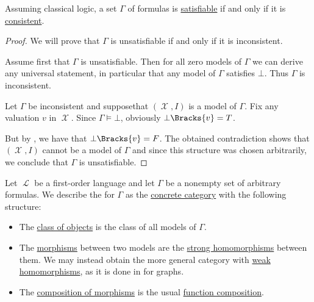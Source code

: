 \begin{proposition}\label{thm:formulas_satisfiable_iff_consistent}
  Assuming classical logic, a set \( \Gamma \) of formulas is \hyperref[def:propositional_semantics/satisfiability]{satisfiable} if and only if it is \hyperref[def:first_order_theory/consistent]{consistent}.
\end{proposition}
\begin{proof}
  We will prove that \( \Gamma \) is unsatisfiable if and only if it is inconsistent\DNE.

  \SufficiencySubProof Assume first that \( \Gamma \) is unsatisfiable. Then for all zero models of \( \Gamma \) we can derive any universal statement, in particular that any model of \( \Gamma \) satisfies \( \bot \). Thus \( \Gamma \) is inconsistent.

  \NecessitySubProof Let \( \Gamma \) be inconsistent and suppose\DNE that \( (\mscrX, I) \) is a model of \( \Gamma \). Fix any valuation \( v \) in \( \mscrX \). Since \( \Gamma \vDash \bot \), obviously \( \bot\Bracks{v} = T \).

  But by , we have that \( \bot\Bracks{v} = F \). The obtained contradiction shows that \( (\mscrX, I) \) cannot be a model of \( \Gamma \) and since this structure was chosen arbitrarily, we conclude that \( \Gamma \) is unsatisfiable.
\end{proof}

\begin{definition}\label{def:category_of_first_order_models}
  Let \( \mscrL \) be a first-order language and let \( \Gamma \) be a nonempty set of arbitrary formulas. We describe the  for \( \Gamma \) as the \hyperref[def:concrete_category]{concrete category} with the following structure:
  \begin{itemize}
    \item The \hyperref[def:category/C1]{class of objects} is the class of all models of \( \Gamma \).

    \item The \hyperref[def:category/C2]{morphisms} between two models are the \hyperref[def:first_order_homomorphism]{strong homomorphisms} between them. We may instead obtain the more general category with \hyperref[def:first_order_homomorphism/predicates_weak]{weak homomorphisms}, as it is done in  for graphs.

    \item The \hyperref[def:category/C3]{composition of morphisms} is the usual \hyperref[def:function/composition]{function composition}.
  \end{itemize}
\end{definition}

